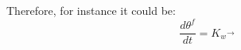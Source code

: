 Therefore, for instance it could be:
\begin{equation}
\frac{d \theta^f}{dt} = K_w \vec{}{}
\end{equation}